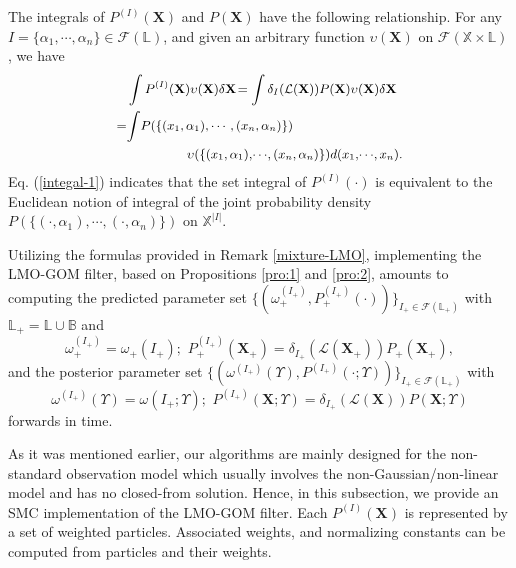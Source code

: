 \documentclass[journal]{IEEEtran}
\newcommand{\bX}{{\mathbf X}}
\begin{document}
{The integrals of $P^{(I)}(\bX)$ and $P(\bX)$ have the following relationship. For any $I=\{\alpha_1,\cdots,\alpha_n\}\in\mathcal{F}(\mathbb{L})$, and given an arbitrary function $\upsilon(\bX)$ on $\mathcal{F}(\mathbb{X}\times\mathbb{L})$, we have
\begin{equation}
{\small
\begin{split}
\label{integal-1} &\int P^{(I)}(\bX) \upsilon(\bX) \delta \bX\!=\int  \delta_{I}(\mathcal{L}(\bX))P(\bX) \upsilon(\bX)\delta\bX\\
 =&\!\int\! P(\{(x_1,\alpha_1),\cdots,(x_n,\alpha_n)\})\\
&\,\,\,\,\,\,\,\,\,\,\,\,\,\,\,\,\,\,\,\,\,\,\,\,\,\,\,\,\upsilon(\{(x_1,\alpha_1),\!\cdots\!,(x_n,\alpha_n)\}) d(x_1,\!\cdots\!,x_n).
\end{split}}
\end{equation}
Eq. (\ref{integal-1}) indicates that the set integral of $P^{(I)}(\cdot)$ is equivalent to  the Euclidean notion of integral of the joint probability density $P(\{(\cdot,\alpha_1),\cdots,(\cdot,\alpha_n)\})$ on $\mathbb{X}^{|I|}.$ 


Utilizing the formulas provided in Remark \ref{mixture-LMO},  implementing the LMO-GOM filter, based on Propositions \ref{pro:1} and \ref{pro:2}, amounts to computing the predicted parameter set   $\{(\omega_{+}^{(I_{+})},P_{+}^{(I_{+})}(\cdot))\}_{I_{+}\in\mathcal{F}(\mathbb{L}_{+})}$
with $\mathbb{L}_+\!=\!\mathbb{L}\cup\mathbb{B}$ 
and $$\omega_{+}^{(I_{+})}=\omega_{+}(I_{+}); \,\,P_{+}^{(I_{+})}(\bX_{+})\!=\!\delta_{I_{+}}(\mathcal{L}(\bX_{+}))P_{+}(\bX_{+}),$$
and the posterior parameter set $\{(\omega^{(I_+\!)}(\Upsilon),\!P^{(I_+\!)}(\cdot;\Upsilon))\}_{I_+\!\in\mathcal{F}(\mathbb{L}_+\!)}$ 
with $$\omega^{(I_+)}(\Upsilon)=\omega(I_+;\Upsilon); \,\,P^{(I_+)}(\bX;\Upsilon)=\delta_{I_+}(\mathcal{L}(\bX))P(\bX;\Upsilon)$$
forwards in time.


As  it was mentioned earlier, our algorithms are mainly designed for the non-standard observation model which usually involves the non-Gaussian/non-linear model and has no closed-from solution. Hence, in this subsection, we provide an SMC implementation of the LMO-GOM filter.  Each $P^{(I)}(\bX)$ is represented by a set of weighted particles. Associated weights, and normalizing constants can be computed from 
particles and their weights.

}
\end{document}
